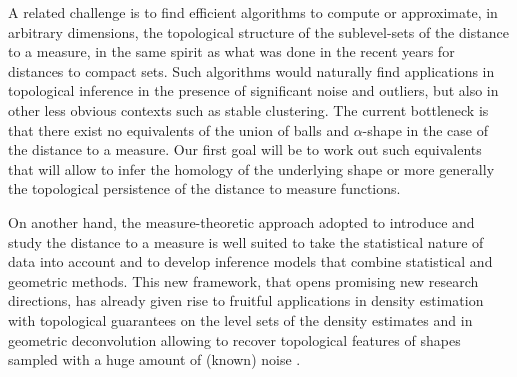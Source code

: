 A related challenge is to find efficient algorithms to compute or approximate,  in arbitrary dimensions, the topological structure of the sublevel-sets of the distance to a measure, in the same spirit as what was done in the recent years for distances to compact sets. Such algorithms would naturally find applications in topological inference in the presence of significant noise and outliers, but also in other less obvious contexts such as stable clustering. The current bottleneck is that there exist no equivalents of the union of balls and $\alpha$-shape in the case of the distance to a measure. Our first goal will be to work out such equivalents that will allow to infer the homology of the underlying shape or more generally the topological persistence of the distance to measure functions.

On another hand, the measure-theoretic approach adopted to introduce and study the distance to a measure is well suited to take the statistical nature of data into account and to develop inference models that combine statistical and geometric methods. This new framework, that opens promising new research directions, has already given rise to fruitful applications in density estimation with topological guarantees on the level sets of the density estimates \cite{bccdr-wknde-11}  and  in geometric deconvolution allowing to recover topological features of shapes sampled with a huge amount of (known) noise  \cite{ccdm-dwmgi-11}.

